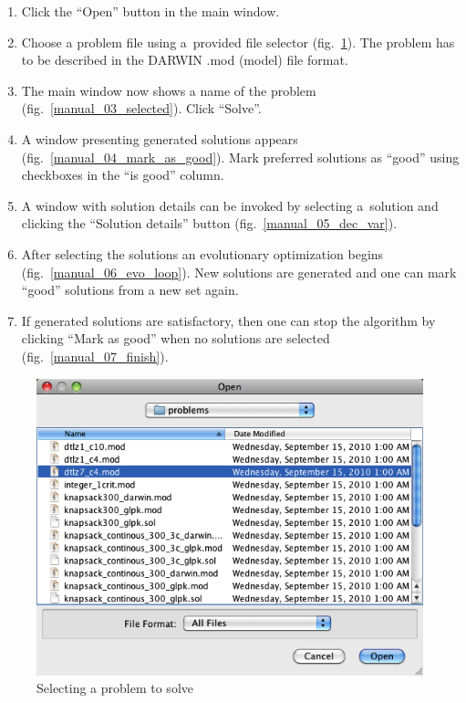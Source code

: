 \begin{enumerate}
\item Click the ``Open'' button in the main window.
\item Choose a problem file using a~provided file selector
  (fig.~\ref{manual_02_problem_selector}). The problem has to be described in
  the DARWIN .mod (model) file format.
\item The main window now shows a name of the problem
  (fig.~\ref{manual_03_selected}). Click ``Solve''.
\item A window presenting generated solutions appears
  (fig.~\ref{manual_04_mark_as_good}). Mark preferred solutions as ``good''
  using checkboxes in the ``is good'' column.
\item A window with solution details can be invoked by selecting a~solution
  and clicking the ``Solution details'' button (fig.~\ref{manual_05_dec_var}).
\item After selecting the solutions an evolutionary optimization begins
  (fig.~\ref{manual_06_evo_loop}). New solutions are generated and one can
  mark ``good'' solutions from a new set again.
\item If generated solutions are satisfactory, then one can stop the
  algorithm by clicking ``Mark as good'' when no solutions are selected
  (fig.~\ref{manual_07_finish}).
\end{enumerate}

\begin{figure}[htb]
  \centering
  \includegraphics[scale=0.7]{img/manual/02_problem_selector}
  \caption{Selecting a problem to solve}
  \label{manual_02_problem_selector}
\end{figure}

